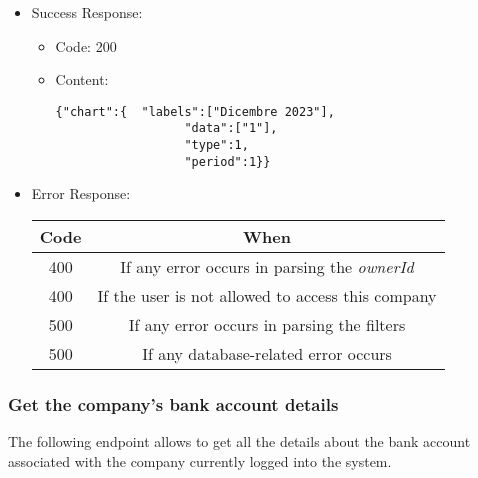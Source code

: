 \begin{itemize}
    \item Success Response:
    \begin{itemize}
        \item Code: 200
        \item Content:
        \begin{lstlisting}
{"chart":{  "labels":["Dicembre 2023"],
                  "data":["1"],
                  "type":1,
                  "period":1}}
        \end{lstlisting}
    \end{itemize}

    \item Error Response:
    \begin{table}[!h]
    \centering
    \begin{tabular}{|c|c|}
    \hline
    \multicolumn{1}{|c|}{\textbf{Code}} & \multicolumn{1}{c|}{\textbf{When}} \\ \hline
    400 & If any error occurs in parsing the \textit{ownerId}  \\\hline
    400 & If the user is not allowed to access this company \\\hline
    500 & If any error occurs in parsing the filters \\\hline
    500 & If any database-related error occurs \\\hline
    \end{tabular}
    \end{table}

\end{itemize}


\newpage
\subsubsection*{Get the company's bank account details}

The following endpoint allows to get all the details about the bank account associated with the company currently logged into the system.

